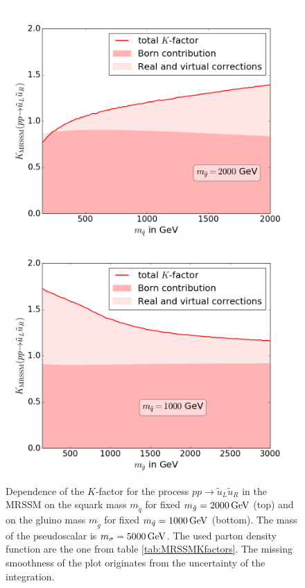 \begin{figure}[H]
\begin{center}
\includegraphics[scale=.4]{figures/MRSSM_uu_susu_Kfactors_msg=2000GeV.png}
\includegraphics[scale=.4]{figures/MRSSM_uu_susu_Kfactors_msq=1000GeV.png}
\caption{Dependence of the $K$-factor for the process $pp \to \tilde{u}_L\tilde{u}_R$ in the MRSSM on the squark mass $m_{\tilde{q}}$ for fixed $m_{\tilde{g}} = \unit[2000]{GeV}$ (top) and on the gluino mass $m_{\tilde{g}}$ for fixed $m_{\tilde{q}} = \unit[1000]{GeV}$ (bottom). The mass of the pseudoscalar is $m_{\sigma} = \unit[5000]{GeV}$. The used parton density function are the one from table \ref{tab:MRSSMKfactors}. The missing smoothness of the plot originates from the uncertainty of the integration.}\label{fig:1LXsection_fixed_m_MRSSM}
\end{center}
\end{figure}
